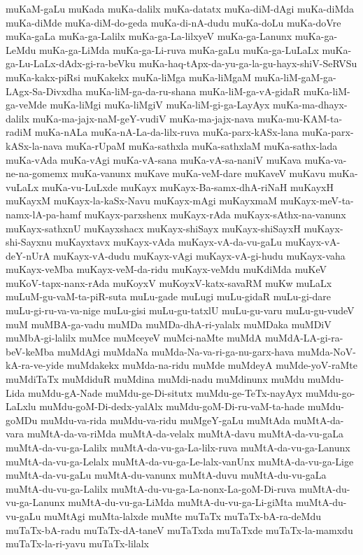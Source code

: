 {muKaM-gaLu
muKada
muKa-dalilx
muKa-datatx
muKa-diM-dAgi
muKa-diMda
muKa-diMde
muKa-diM-do-geda
muKa-di-nA-dudu
muKa-doLu
muKa-doVre
muKa-gaLa
muKa-ga-Lalilx
muKa-ga-La-lilxyeV
muKa-ga-Lanunx
muKa-ga-LeMdu
muKa-ga-LiMda
muKa-ga-Li-ruva
muKa-gaLu
muKa-ga-LuLaLx
muKa-ga-Lu-LaLx-dAdx-gi-ra-beVku
muKa-haq-tApx-da-yu-ga-la-gu-hayx-shiV-SeRVSu
muKa-kakx-piRsi
muKakekx
muKa-liMga
muKa-liMgaM
muKa-liM-gaM-ga-LAgx-Sa-Divxdha
muKa-liM-ga-da-ru-shana
muKa-liM-ga-vA-gidaR
muKa-liM-ga-veMde
muKa-liMgi
muKa-liMgiV
muKa-liM-gi-ga-LayAyx
muKa-ma-dhayx-dalilx
muKa-ma-jajx-naM-geY-vudiV
muKa-ma-jajx-nava
muKa-mu-KAM-ta-radiM
muKa-nALa
muKa-nA-La-da-lilx-ruva
muKa-parx-kASx-lana
muKa-parx-kASx-la-nava
muKa-rUpaM
muKa-sathxla
muKa-sathxlaM
muKa-sathx-lada
muKa-vAda
muKa-vAgi
muKa-vA-sana
muKa-vA-sa-naniV
muKava
muKa-va-ne-na-gomemx
muKa-vanunx
muKave
muKa-veM-dare
muKaveV
muKavu
muKa-vuLaLx
muKa-vu-LuLxde
muKayx
muKayx-Ba-samx-dhA-riNaH
muKayxH
muKayxM
muKayx-la-kaSx-Navu
muKayx-mAgi
muKayxmaM
muKayx-meV-ta-namx-lA-pa-hamf
muKayx-parxshenx
muKayx-rAda
muKayx-sAthx-na-vanunx
muKayx-sathxnU
muKayxshacx
muKayx-shiSayx
muKayx-shiSayxH
muKayx-shi-Sayxnu
muKayxtavx
muKayx-vAda
muKayx-vA-da-vu-gaLu
muKayx-vA-deY-nUrA
muKayx-vA-dudu
muKayx-vAgi
muKayx-vA-gi-hudu
muKayx-vaha
muKayx-veMba
muKayx-veM-da-ridu
muKayx-veMdu
muKdiMda
muKeV
muKoV-tapx-nanx-rAda
muKoyxV
muKoyxV-katx-savaRM
muKw
muLaLx
muLuM-gu-vaM-ta-piR-suta
muLu-gade
muLugi
muLu-gidaR
muLu-gi-dare
muLu-gi-ru-va-va-nige
muLu-gisi
muLu-gu-tatxlU
muLu-gu-varu
muLu-gu-vudeV
muM
muMBA-ga-vadu
muMDa
muMDa-dhA-ri-yalalx
muMDaka
muMDiV
muMbA-gi-lalilx
muMce
muMceyeV
muMci-naMte
muMdA
muMdA-LA-gi-ra-beV-keMba
muMdAgi
muMdaNa
muMda-Na-va-ri-ga-nu-garx-hava
muMda-NoV-kA-ra-ve-yide
muMdakekx
muMda-na-ridu
muMde
muMdeyA
muMde-yoV-raMte
muMdiTaTx
muMdiduR
muMdina
muMdi-nadu
muMdinunx
muMdu
muMdu-Lida
muMdu-gA-Nade
muMdu-ge-Di-situtx
muMdu-ge-TeTx-nayAyx
muMdu-go-LaLxlu
muMdu-goM-Di-dedx-yalAlx
muMdu-goM-Di-ru-vaM-ta-hade
muMdu-goMDu
muMdu-va-rida
muMdu-va-ridu
muMgeY-gaLu
muMtAda
muMtA-da-vara
muMtA-da-va-riMda
muMtA-da-velalx
muMtA-davu
muMtA-da-vu-gaLa
muMtA-da-vu-ga-Lalilx
muMtA-da-vu-ga-La-lilx-ruva
muMtA-da-vu-ga-Lanunx
muMtA-da-vu-ga-Lelalx
muMtA-da-vu-ga-Le-lalx-vanUnx
muMtA-da-vu-ga-Lige
muMtA-da-vu-gaLu
muMtA-du-vanunx
muMtA-duvu
muMtA-du-vu-gaLa
muMtA-du-vu-ga-Lalilx
muMtA-du-vu-ga-La-nonx-La-goM-Di-ruva
muMtA-du-vu-ga-Lanunx
muMtA-du-vu-ga-LiMda
muMtA-du-vu-ga-Li-giMta
muMtA-du-vu-gaLu
muMtAgi
muMta-lalxde
muMte
muTaTx
muTaTx-bA-ra-deMdu
muTaTx-bA-radu
muTaTx-dA-taneV
muTaTxda
muTaTxde
muTaTx-la-mamxdu
muTaTx-la-ri-yavu
muTaTx-lilalx
}
